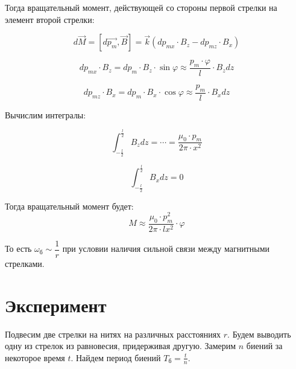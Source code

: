 \documentclass{letask}
\begin{document}
Тогда вращательный момент, действующей со стороны первой стрелки на элемент второй стрелки:

\begin{equation}
d \vec{M} = \left[ d \vec{p_m} , \vec{B}  \right] = \vec{k} (dp_{mx} \cdot B_z - dp_{mz} \cdot B_x)
\end{equation}

$$dp_{mx} \cdot B_z = dp_m \cdot B_z \cdot \sin \varphi \approx \dfrac{p_m \cdot \varphi}{l} \cdot B_z dz$$

$$dp_{mz} \cdot B_x = dp_m \cdot B_x \cdot \cos \varphi \approx \dfrac{p_m}{l} \cdot B_x dz$$

Вычислим интегралы:

\begin{equation}
\int_{-\frac{l}{2}}^{\frac{l}{2}} B_z dz = \cdots = \dfrac{\mu_0 \cdot p_m}{2 \pi \cdot x^2}
\end{equation}

\begin{equation}
\int_{-\frac{l}{2}}^{\frac{l}{2}} B_x dz = 0
\end{equation}

Тогда вращательный момент будет:
\begin{equation}
M \approx \dfrac{\mu_0 \cdot p_m^2}{2 \pi \cdot lx^2} \cdot \varphi
\end{equation}

То есть $\omega_\text{б} \sim \dfrac{1}{r}$ при условии наличия сильной связи между магнитными стрелками.


\section{Эксперимент}
Подвесим две стрелки на нитях на различных расстояниях $r$. Будем выводить одну из стрелок из равновесия, придерживая другую. Замерим $n$ биений за некоторое время $t$. Найдем период биений $T_\text{б} = \frac{t}{n}$.
\end{document}
